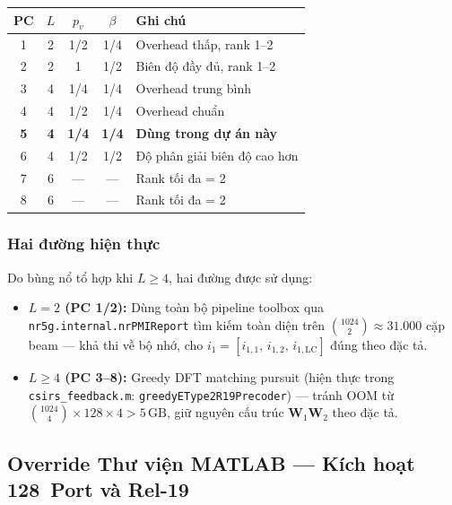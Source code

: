 \documentclass[12pt, a4paper]{article}
\newcommand{\file}[1]{\texttt{#1}}
\begin{document}
\begin{center}
\begin{tabular}{ccccL{5cm}}
\toprule
\textbf{PC} & $L$ & $p_v$ & $\beta$ & \textbf{Ghi chú} \\
 & 2 & 1/2 & 1/4 & Overhead thấp, rank 1--2 \\
2 & 2 & 1   & 1/2 & Biên độ đầy đủ, rank 1--2 \\
3 & 4 & 1/4 & 1/4 & Overhead trung bình \\
4 & 4 & 1/2 & 1/4 & Overhead chuẩn \\
\textbf{5} & \textbf{4} & \textbf{1/4} & \textbf{1/4} &
  \textbf{Dùng trong dự án này} \\
6 & 4 & 1/2 & 1/2 & Độ phân giải biên độ cao hơn \\
7 & 6 & ---  & --- & Rank tối đa = 2 \\
8 & 6 & ---  & --- & Rank tối đa = 2 \\
\bottomrule
\end{tabular}
\label{tab:pc}
\end{center}

\subsubsection{Hai đường hiện thực}

Do bùng nổ tổ hợp khi $L \geq 4$, hai đường được sử dụng:
\begin{itemize}
  \item \textbf{$L = 2$ (PC 1/2):} Dùng toàn bộ pipeline toolbox qua
        \texttt{nr5g.internal.nrPMIReport} tìm kiếm toàn diện trên
        $\binom{1024}{2} \approx 31.000$ cặp beam --- khả thi về bộ
        nhớ, cho $i_1 = [i_{1,1},\, i_{1,2},\, i_{1,\mathrm{LC}}]$
        đúng theo đặc tả.
  \item \textbf{$L \geq 4$ (PC 3--8):} Greedy DFT matching pursuit
        (hiện thực trong \file{csirs\_feedback.m}:
        \texttt{greedyEType2R19Precoder}) --- tránh OOM từ
        $\binom{1024}{4} \times 128 \times 4 > 5\,\text{GB}$, giữ
        nguyên cấu trúc $\mathbf{W}_1\mathbf{W}_2$ theo đặc tả.
\end{itemize}

\subsection{Override Thư viện MATLAB --- Kích hoạt 128~Port và Rel-19}
\end{document}
